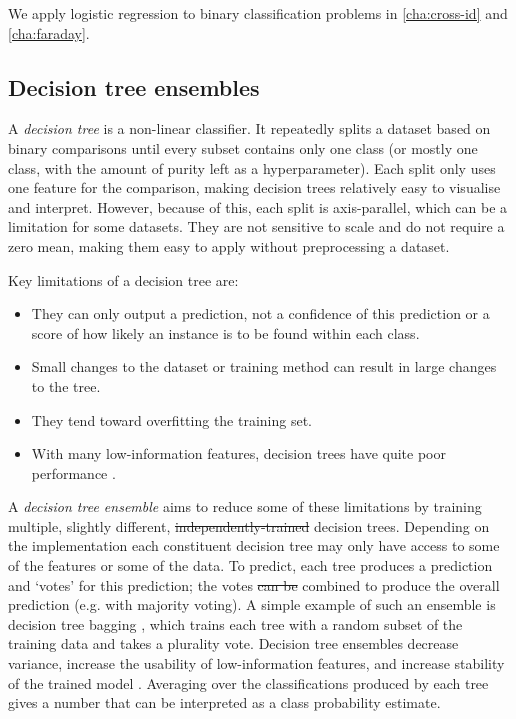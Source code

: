 \documentclass[11pt, a4paper]{book}
\newcommand{\defn}[1]{\emph{#1}}
\providecommand{\DIFaddtex}[1]{{\protect\color{blue}\uwave{#1}}} %
\providecommand{\DIFdeltex}[1]{{\protect\color{red}\sout{#1}}}                      %
\providecommand{\DIFaddbegin}{} %
\providecommand{\DIFaddend}{} %
\providecommand{\DIFdelbegin}{} %
\providecommand{\DIFdelend}{} %
\providecommand{\DIFadd}[1]{\texorpdfstring{\DIFaddtex{#1}}{#1}} %
\providecommand{\DIFdel}[1]{\texorpdfstring{\DIFdeltex{#1}}{}} %
\newcommand{\DIFscaledelfig}{0.5}
\newlength{\DIFdelgraphicswidth} %
\newlength{\DIFdelgraphicsheight} %
\newcommand{\DIFaddincludegraphics}[2][]{{\color{blue}\fbox{\DIFOincludegraphics[#1]{#2}}}} %
\newcommand{\DIFdelincludegraphics}[2][]{%
\sbox{\DIFdelgraphicsbox}{\DIFOincludegraphics[#1]{#2}}%
\settoboxwidth{\DIFdelgraphicswidth}{\DIFdelgraphicsbox} %
\settoboxtotalheight{\DIFdelgraphicsheight}{\DIFdelgraphicsbox} %
\scalebox{\DIFscaledelfig}{%
\parbox[b]{\DIFdelgraphicswidth}{\usebox{\DIFdelgraphicsbox}\\[-\baselineskip] \rule{\DIFdelgraphicswidth}{0em}}\llap{\resizebox{\DIFdelgraphicswidth}{\DIFdelgraphicsheight}{%
\setlength{\unitlength}{\DIFdelgraphicswidth}%
\begin{picture}(1,1)%
\thicklines\linethickness{2pt} %
{\color[rgb]{1,0,0}\put(0,0){\framebox(1,1){}}}%
{\color[rgb]{1,0,0}\put(0,0){\line( 1,1){1}}}%
{\color[rgb]{1,0,0}\put(0,1){\line(1,-1){1}}}%
\end{picture}%
}\hspace*{3pt}}} %
} %
\DeclareRobustCommand{\DIFaddbegin}{\DIFOaddbegin \let\includegraphics\DIFaddincludegraphics} %
\DeclareRobustCommand{\DIFaddend}{\DIFOaddend \let\includegraphics\DIFOincludegraphics} %
\DeclareRobustCommand{\DIFdelbegin}{\DIFOdelbegin \let\includegraphics\DIFdelincludegraphics} %
\DeclareRobustCommand{\DIFdelend}{\DIFOaddend \let\includegraphics\DIFOincludegraphics} %
\begin{document}
        We apply logistic regression to binary classification problems in \autoref{cha:cross-id} and \autoref{cha:faraday}.

    \subsection{Decision tree ensembles}
    \label{sec:decision-trees}

        A \defn{decision tree} is a non-linear classifier. It repeatedly splits a dataset based on binary comparisons until every subset contains only one class (or mostly one class, with the amount of purity left as a hyperparameter). Each split only uses one feature for the comparison, making decision trees relatively easy to visualise and interpret. However, because of this, each split is axis-parallel, which can be a limitation for some datasets. They are not sensitive to scale and do not require a zero mean, making them easy to apply without preprocessing a dataset.

        Key limitations of a decision tree are:
        \begin{itemize}
            \item They can only output a prediction, not a confidence of this prediction or a score of how likely an instance is to be found within each class.
            \item Small changes to the dataset or training method can result in large changes to the tree.
            \item They tend toward overfitting the training set.
            \item With many low-information features, decision trees have quite poor performance \citep{breiman01random-forest}.
        \end{itemize}

        A \defn{decision tree ensemble} aims to reduce some of these limitations by training multiple, slightly different, \DIFdelbegin \DIFdel{independently-trained }\DIFdelend \DIFaddbegin \DIFadd{independently trained }\DIFaddend decision trees. Depending on the implementation each constituent decision tree may only have access to some of the features or some of the data. To predict, each tree produces a prediction and `votes' for this prediction; the votes \DIFdelbegin \DIFdel{can be }\DIFdelend \DIFaddbegin \DIFadd{are }\DIFaddend combined to produce the overall prediction (e.g. with majority voting). A simple example of such an ensemble is decision tree bagging \citep{breiman_bagging_1996}, which trains each tree with a random subset of the training data and takes a plurality vote. Decision tree ensembles decrease variance, increase the usability of low-information features, and increase stability of the trained model \citep{breiman01random-forest}. Averaging over the classifications produced by each tree gives a number that can be interpreted as a class probability estimate.
\end{document}
